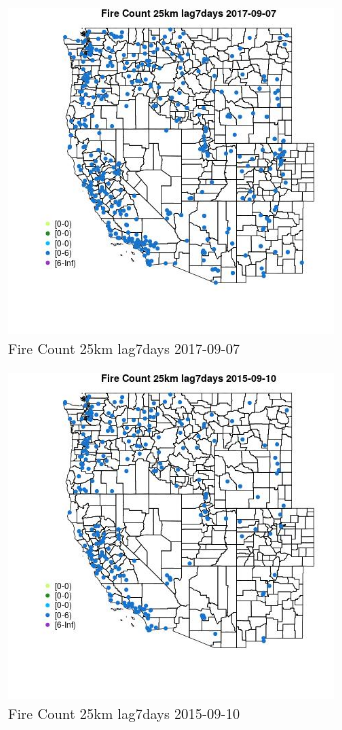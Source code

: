\begin{figure} 
\centering  
\includegraphics[width=0.77\textwidth]{Code_Outputs/Report_ML_input_PM25_Step4_part_e_de_duplicated_aves_compiled_2019-05-21wNAs_MapObsFire_Count_25km_lag7days2017-09-07.jpg} 
\caption{\label{fig:Report_ML_input_PM25_Step4_part_e_de_duplicated_aves_compiled_2019-05-21wNAsMapObsFire_Count_25km_lag7days2017-09-07}Fire Count 25km lag7days 2017-09-07} 
\end{figure} 
 

\begin{figure} 
\centering  
\includegraphics[width=0.77\textwidth]{Code_Outputs/Report_ML_input_PM25_Step4_part_e_de_duplicated_aves_compiled_2019-05-21wNAs_MapObsFire_Count_25km_lag7days2015-09-10.jpg} 
\caption{\label{fig:Report_ML_input_PM25_Step4_part_e_de_duplicated_aves_compiled_2019-05-21wNAsMapObsFire_Count_25km_lag7days2015-09-10}Fire Count 25km lag7days 2015-09-10} 
\end{figure} 
 

